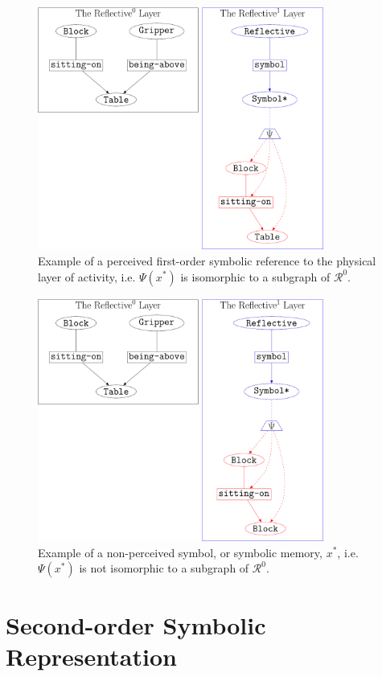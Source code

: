 \begin{figure}
\center
\includegraphics[height=8cm]{gfx/example_symbolic_reference_to_physical_activity}
\caption[Example of a perceived first-order symbolic reference to the
  physical layer of activity.]{Example of a perceived first-order
  symbolic reference to the physical layer of activity,
  i.e. $\Psi(x^*)$ is isomorphic to a subgraph of $\mathcal{R}^0$.}
\label{figure:example_symbolic_reference_to_physical_activity}
\end{figure}
\begin{figure}
\center
\includegraphics[height=8cm]{gfx/example_symbolic_memory}
\caption[Example of a non-perceived symbol, or symbolic
  memory.]{Example of a non-perceived symbol, or symbolic memory,
  $x^*$, i.e. $\Psi(x^*)$ is not isomorphic to a subgraph of
  $\mathcal{R}^0$.}
\label{figure:example_symbolic_memory}
\end{figure}

\section{Second-order Symbolic Representation}

